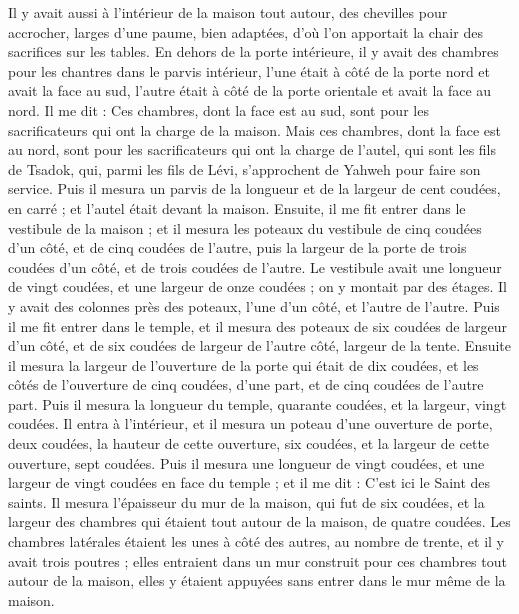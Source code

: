 \begin{multicols}{2}
Il y avait aussi à l'intérieur de la maison tout autour, des chevilles pour accrocher, larges d'une paume, bien adaptées, d'où l'on apportait la chair des sacrifices sur les tables.
En dehors de la porte intérieure, il y avait des chambres pour les chantres dans le parvis intérieur, l'une était à côté de la porte nord et avait la face au sud, l'autre était à côté de la porte orientale et avait la face au nord.
Il me dit : Ces chambres, dont la face est au sud, sont pour les sacrificateurs qui ont la charge de la maison.
Mais ces chambres, dont la face est au nord, sont pour les sacrificateurs qui ont la charge de l'autel, qui sont les fils de Tsadok, qui, parmi les fils de Lévi, s'approchent de Yahweh pour faire son service.
Puis il mesura un parvis de la longueur et de la largeur de cent coudées, en carré ; et l'autel était devant la maison.
Ensuite, il me fit entrer dans le vestibule de la maison ; et il mesura les poteaux du vestibule de cinq coudées d'un côté, et de cinq coudées de l'autre, puis la largeur de la porte de trois coudées d'un côté, et de trois coudées de l'autre.
Le vestibule avait une longueur de vingt coudées, et une largeur de onze coudées ; on y montait par des étages. Il y avait des colonnes près des poteaux, l'une d'un côté, et l'autre de l'autre.
\VerseOne{}Puis il me fit entrer dans le temple, et il mesura des poteaux de six coudées de largeur d'un côté, et de six coudées de largeur de l'autre côté, largeur de la tente.
Ensuite il mesura la largeur de l'ouverture de la porte qui était de dix coudées, et les côtés de l'ouverture de cinq coudées, d'une part, et de cinq coudées de l'autre part. Puis il mesura la longueur du temple, quarante coudées, et la largeur, vingt coudées.
Il entra à l'intérieur, et il mesura un poteau d'une ouverture de porte, deux coudées, la hauteur de cette ouverture, six coudées, et la largeur de cette ouverture, sept coudées.
Puis il mesura une longueur de vingt coudées, et une largeur de vingt coudées en face du temple ; et il me dit : C'est ici le Saint des saints.
Il mesura l'épaisseur du mur de la maison, qui fut de six coudées, et la largeur des chambres qui étaient tout autour de la maison, de quatre coudées.
Les chambres latérales étaient les unes à côté des autres, au nombre de trente, et il y avait trois poutres ; elles entraient dans un mur construit pour ces chambres tout autour de la maison, elles y étaient appuyées sans entrer dans le mur même de la maison.

\end{multicols}
